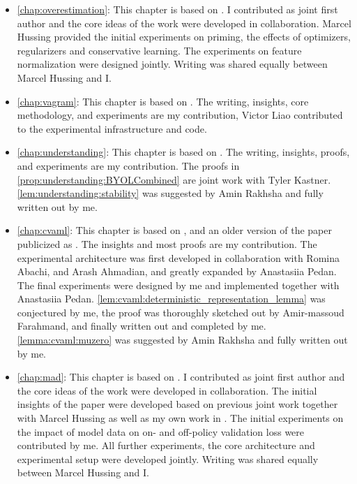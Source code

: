 \begin{itemize}
    \item \autoref{chap:overestimation}: This chapter is based on . I contributed as joint first author and the core ideas of the work were developed in collaboration. Marcel Hussing provided the initial experiments on priming, the effects of optimizers, regularizers and conservative learning. The experiments on feature normalization were designed jointly. Writing was shared equally between Marcel Hussing and I.
    \item \autoref{chap:vagram}: This chapter is based on . The writing, insights, core methodology, and experiments are my contribution, Victor Liao contributed to the experimental infrastructure and code.
    \item \autoref{chap:understanding}: This chapter is based on . The writing, insights, proofs, and experiments are my contribution. The proofs in \autoref{prop:understanding:BYOLCombined} are joint work with Tyler Kastner. \autoref{lem:understanding:stability} was suggested by Amin Rakhsha and fully written out by me.
    \item \autoref{chap:cvaml}: This chapter is based on , and an older version of the paper publicized as . The insights and most proofs are my contribution. The experimental architecture was first developed in collaboration with Romina Abachi, and Arash Ahmadian, and greatly expanded by Anastasiia Pedan. The final experiments were designed by me and implemented together with Anastasiia Pedan. \autoref{lem:cvaml:deterministic_representation_lemma} was conjectured by me, the proof was thoroughly sketched out by Amir-massoud Farahmand, and finally written out and completed by me. \autoref{lemma:cvaml:muzero} was suggested by Amin Rakhsha and fully written out by me.
    \item \autoref{chap:mad}: This chapter is based on . I contributed as joint first author and the core ideas of the work were developed in collaboration. The initial insights of the paper were developed based on previous joint work \cite{hussing2024dissecting} together with Marcel Hussing as well as my own work in \textcite{voelcker2023lambda}. The initial experiments on the impact of model data on on- and off-policy validation loss were contributed by me. All further experiments, the core architecture and experimental setup were developed jointly. Writing was shared equally between Marcel Hussing and I.
\end{itemize}


